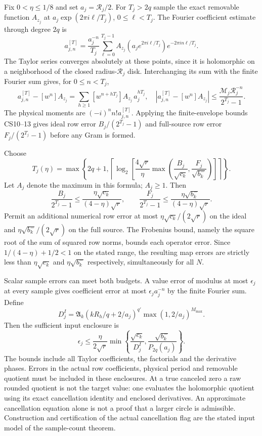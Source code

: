 \documentclass[11pt]{article}
\begin{document}
Fix \(0<\eta\le1/8\) and set \(a_j=\mathcal R_j/2\). For \(T_j>2q\) sample the exact removable function \(A_{z_j}\) at \(a_j\exp(2\pi i\ell/T_j)\), \(0\le\ell<T_j\). The Fourier coefficient estimate through degree \(2q\) is \[
 a^{[T]}_{j,n}=\frac{a_j^{-n}}{T_j}\sum_{\ell=0}^{T_j-1}A_{z_j}(a_je^{2\pi i\ell/T_j})e^{-2\pi in\ell/T_j}.
\] The Taylor series converges absolutely at these points, since it is holomorphic on a neighborhood of the closed radius-\(\mathcal R_j\) disk. Interchanging its sum with the finite Fourier sum gives, for \(0\le n<T_j\), \[
 a^{[T]}_{j,n}-[w^n]A_{z_j}
 =\sum_{h\ge1}[w^{n+hT_j}]A_{z_j}\,a_j^{hT_j},
 \quad |a^{[T]}_{j,n}-[w^n]A_{z_j}|
 \le\frac{\mathcal M_j\mathcal R_j^{-n}}{2^{T_j}-1}.
 \tag{CS14}
\] The physical moments are \((-i)^nn!a^{[T]}_{j,n}\). Applying the finite-envelope bounds CS10--13 gives ideal row error \(B_j/(2^{T_j}-1)\) and full-source row error \(F_j/(2^{T_j}-1)\) before any Gram is formed.

Choose \[
 \boxed{T_j(\eta)=\max\left\{2q+1,\left\lceil\log_2\left[\frac{4\sqrt r}{\eta}\max\left(\frac{B_j}{\sqrt{c_k}},\frac{F_j}{\sqrt{b_k^-}}\right)\right]\right\rceil\right\}.}
 \tag{CS15}
\] Let \(A_j\) denote the maximum in this formula; \(A_j\ge1\). Then \[
 \frac{B_j}{2^{T_j}-1}\le\frac{\eta\sqrt{c_k}}{(4-\eta)\sqrt r},\qquad
 \frac{F_j}{2^{T_j}-1}\le\frac{\eta\sqrt{b_k^-}}{(4-\eta)\sqrt r}.
\] Permit an additional numerical row error at most \(\eta\sqrt{c_k}/(2\sqrt r)\) on the ideal and \(\eta\sqrt{b_k^-}/(2\sqrt r)\) on the full source. The Frobenius bound, namely the square root of the sum of squared row norms, bounds each operator error. Since \(1/(4-\eta)+1/2<1\) on the stated range, the resulting map errors are strictly less than \(\eta\sqrt{c_k}\) and \(\eta\sqrt{b_k^-}\) respectively, simultaneously for all \(N\).

Scalar sample errors can meet both budgets. A value error of modulus at most \(\epsilon_j\) at every sample gives coefficient error at most \(\epsilon_ja_j^{-n}\) by the finite Fourier sum. Define \[
 D_j^I=\mathfrak A_k(kR_h/q+2/a_j)^{q'}\max(1,2/a_j)^{M_{\max}}.
\] Then the sufficient input enclosure is \[
 \boxed{\epsilon_j\le\frac{\eta}{2\sqrt r}
 \min\left\{\frac{\sqrt{c_k}}{D_j^I},\frac{\sqrt{b_k^-}}{P_{2q}(a_j)}\right\}.}
 \tag{CS16}
\] The bounds include all Taylor coefficients, the factorials and the derivative phases. Errors in the actual row coefficients, physical period and removable quotient must be included in these enclosures. At a true canceled zero a raw rounded quotient is not the target value: one evaluates the holomorphic quotient using its exact cancellation identity and enclosed derivatives. An approximate cancellation equation alone is not a proof that a larger circle is admissible. Construction and certification of the actual cancellation flag are the stated input model of the sample-count theorem.
\end{document}
